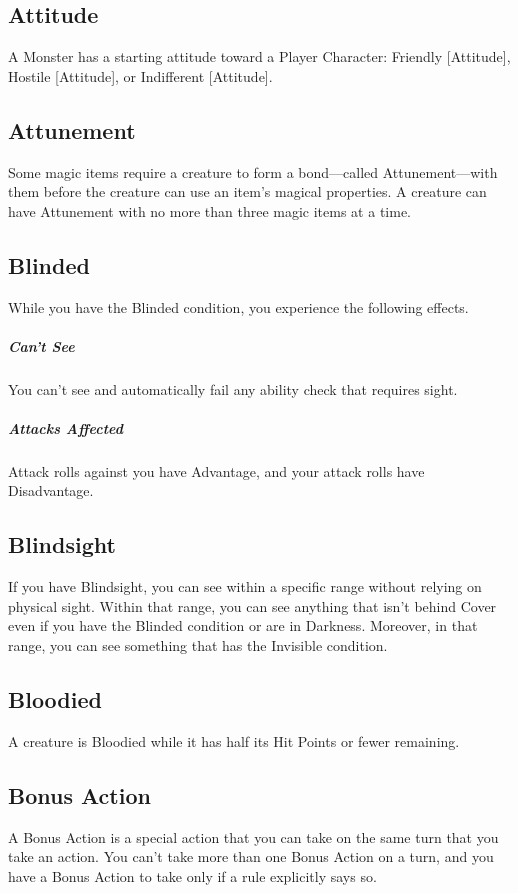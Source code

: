 \documentclass[10pt,a4paper,twoside,bg=print,twocolumn,openany,nodeprecatedcode]{dndarticle}
\begin{document}
\subsection{Attitude}
A Monster has a starting attitude toward a Player Character: Friendly [Attitude], Hostile [Attitude], or Indifferent [Attitude].

\subsection{Attunement}
Some magic items require a creature to form a bond—called Attunement—with them before the creature can use an item's magical properties. A creature can have Attunement with no more than three magic items at a time.

\subsection{Blinded}
While you have the Blinded condition, you experience the following effects.

\subparagraph{Can't See}
You can't see and automatically fail any ability check that requires sight.

\subparagraph{Attacks Affected}
Attack rolls against you have Advantage, and your attack rolls have Disadvantage.

\subsection{Blindsight}
If you have Blindsight, you can see within a specific range without relying on physical sight. Within that range, you can see anything that isn't behind Cover even if you have the Blinded condition or are in Darkness. Moreover, in that range, you can see something that has the Invisible condition.

\subsection{Bloodied}
A creature is Bloodied while it has half its Hit Points or fewer remaining.

\subsection{Bonus Action}
A Bonus Action is a special action that you can take on the same turn that you take an action. You can't take more than one Bonus Action on a turn, and you have a Bonus Action to take only if a rule explicitly says so.
\end{document}
